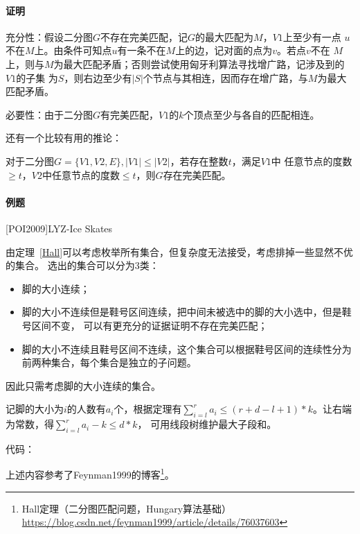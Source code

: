 \paragraph{证明}
充分性：假设二分图$G$不存在完美匹配，记$G$的最大匹配为$M$，$V1$上至少有一点
$u$不在$M$上。由条件可知点$u$有一条不在$M$上的边，记对面的点为$v$。若点$v$不在
$M$上，则与$M$为最大匹配矛盾；否则尝试使用匈牙利算法寻找增广路，记涉及到的$V1$的子集
为$S$，则右边至少有$|S|$个节点与其相连，因而存在增广路，与$M$为最大匹配矛盾。

必要性：由于二分图$G$有完美匹配，$V1$的$k$个顶点至少与各自的匹配相连。

还有一个比较有用的推论：
\begin{inference}
   对于二分图$G=\{V1,V2,E\},|V1|\leq|V2|$，若存在整数$t$，满足$V1$中
   任意节点的度数$\geq t$，$V2$中任意节点的度数$\leq t$，则$G$存在完美匹配。
\end{inference}

\paragraph{例题}
[POI2009]LYZ-Ice Skates

由定理~\ref{Hall}可以考虑枚举所有集合，但复杂度无法接受，考虑排掉一些显然不优的集合。
选出的集合可以分为3类：
\begin{itemize}
    \item 脚的大小连续；
    \item 脚的大小不连续但是鞋号区间连续，把中间未被选中的脚的大小选中，但是鞋号区间不变，
    可以有更充分的证据证明不存在完美匹配；
    \item 脚的大小不连续且鞋号区间不连续，这个集合可以根据鞋号区间的连续性分为
    前两种集合，每个集合是独立的子问题。
\end{itemize}
因此只需考虑脚的大小连续的集合。

记脚的大小为$i$的人数有$a_i$个，根据定理有$\displaystyle \sum_{i=l}^r{a_i}
\leq (r+d-l+1)*k$。让右端为常数，得$\displaystyle \sum_{i=l}^r{a_i-k}\leq d*k$，
可用线段树维护最大子段和。

代码：


上述内容参考了Feynman1999的博客\footnote{
    Hall定理（二分图匹配问题，Hungary算法基础）
    \url{https://blog.csdn.net/feynman1999/article/details/76037603}
}。
